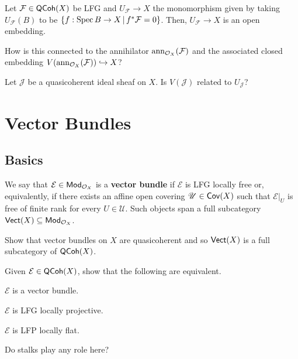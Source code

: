 \documentclass[11pt]{article}
\renewcommand{\F}{\mathcal{F}}
\newcommand{\EE}{\mathcal{E}}
\newcommand{\J}{\mathcal{J}}
\newcommand{\U}{\mathscr{U}}
\begin{document}
\begin{corollary}
Let $\F\in\QCoh(X)$ be LFG and $U_{\F}\to X$ the monomorphism given by taking $U_{\F}(B)$ to be $\{f: \Spec B\to X \,|\, f^*\F=0\}$. Then, $U_{\F}\to X$ is an open embedding.
\end{corollary}

\begin{exercise}
How is this connected to the annihilator $\ann_{\O_X}(\F)$ and the associated closed embedding $V(\ann_{\O_X}(\F))\inj X$?
\end{exercise}

\begin{exercise}
Let $\J$ be a quasicoherent ideal sheaf on $X$. Is $V(\J)$ related to $U_{\J}$?
\end{exercise}

\begin{comment}
Extensions and contractions of ideals
Colon ideals
Invertible ideal sheaves and invertible sheaves more generally
Vector bundles (and specifically line bundles)
Fractional ideal
Cartier divisor
Weil divisor
\end{comment}

\section{Vector Bundles}
\subsection{Basics}
\begin{definition}
We say that $\EE\in\Mod_{\O_X}$ is a \textbf{vector bundle} if $\EE$ is LFG locally free or, equivalently, if there exists an affine open covering $\U\in\Cov(X)$ such that $\EE|_U$ is free of finite rank for every $U\in\U$. Such objects span a full subcategory $\operatorname{\mathsf{Vect}}(X)\subseteq\operatorname{\mathsf{Mod}}_{\mathcal{O}_X}$.
\end{definition}

\begin{exercise}
Show that vector bundles on $X$ are quasicoherent and so $\operatorname{\mathsf{Vect}}(X)$ is a full subcategory of $\operatorname{\mathsf{QCoh}}(X)$.
\end{exercise}

\begin{exercise}
Given $\EE\in\QCoh(X)$, show that the following are equivalent.
\begin{enum}{\roman}
\item $\EE$ is a vector bundle.

\item $\EE$ is LFG locally projective.

\item $\EE$ is LFP locally flat.
\end{enum}
Do stalks play any role here?
\end{exercise}
\end{document}
